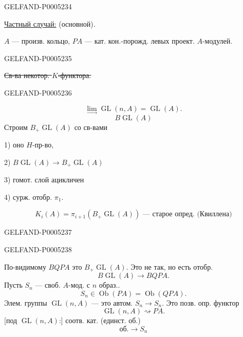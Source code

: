 \begin{GelfandAdjacentEvidence}{GELFAND-P000523}{4}

\uline{Частный случай:} (основной).

$A$ — произв. кольцо, $PA$ — кат. кон.-порожд. левых проект. $A$-модулей.
\end{GelfandAdjacentEvidence}
\begin{GelfandAdjacentEvidence}{GELFAND-P000523}{5}


\sout{Св-ва некотор. \mbox{$K$}-функтора.}
\end{GelfandAdjacentEvidence}
\begin{GelfandAdjacentEvidence}{GELFAND-P000523}{6}


\[
\underset{\longrightarrow}{\lim}\operatorname{GL}(n,A)=\operatorname{GL}(A).
\]
\[
B\operatorname{GL}(A)
\]
Строим $B_+\operatorname{GL}(A)$ со св-вами

1) оно $H$-пр-во,

2) $B\operatorname{GL}(A)\longrightarrow B_+\operatorname{GL}(A)$

3) гомот. слой ацикличен

4) сурж. отобр. $\pi_1$.

\[
K_i(A)=\pi_{i+1}(B_+\operatorname{GL}(A))
\text{ — старое опред. (Квиллена)}
\]
\end{GelfandAdjacentEvidence}
\begin{GelfandAdjacentEvidence}{GELFAND-P000523}{7}


\end{GelfandAdjacentEvidence}
\begin{GelfandAdjacentEvidence}{GELFAND-P000523}{8}

По-видимому $BQPA$ это $B_+\operatorname{GL}(A)$. Это не так, но есть отобр.
\[
B\operatorname{GL}(A)\longrightarrow BQPA.
\]
Пусть $S_n$ — своб. $A$-мод. с $n$ образ..
\[
S_n\in\operatorname{Ob}(PA)=\operatorname{Ob}(QPA).
\]
Элем. группы $\operatorname{GL}(n,A)$ — это автом. $S_n\longrightarrow S_n$.
Это позв. опр. функтор
\[
\operatorname{GL}(n,A)\rightsquigarrow PA.
\]
[под $\operatorname{GL}(n,A)$:] соотв. кат. (единст. об.)
\[
\text{об.}\longrightarrow S_n
\]
\end{GelfandAdjacentEvidence}



